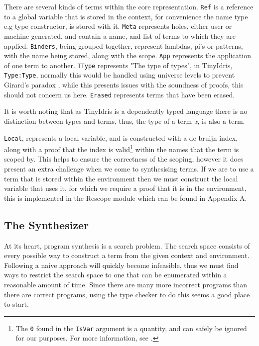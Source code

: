 \documentclass[a4paper]{article}
\begin{document}
There are several kinds of terms within the core representation. 
\texttt{Ref} is a reference to a global variable that is stored in the context, for convenience the name type e.g type constructor, is 
stored with it. \texttt{Meta} represents holes, either user or machine generated, and contain a name, and list of terms to which 
they are applied. \texttt{Binders}, being grouped together, represent lambdas, pi's or patterns, with the name being stored, along with the scope.
\texttt{App} represents the application
of one term to another. \texttt{TType} represents "The type of types", in TinyIdris, \texttt{Type:Type}, normally this would be 
handled using universe levels to prevent Girard's paradox \cite{10.1007/BFb0014058} ,  while this presents issues with the soundness of proofs, this should not concern us here.
\texttt{Erased} represents terms that have been erased. 

It is worth noting that as TinyIdris is a dependently typed language there is no distinction between types and terms, thus, the type of a term \emph{x}, 
is also a term.

\texttt{Local}, represents a local variable, and is constructed with a de bruijn index, along with a proof that the index is 
valid\footnote{The \texttt{0} found in the \texttt{IsVar} argument is a quantity, and can safely be ignored for our purposes. For more information, see \cite{BibEntry2020Nov}.} within the names that the term is scoped by. This helps to ensure the correctness of the scoping, however it 
does present an extra challenge when we come to synthesising terms. If we are to use a term that is stored within the 
environment then we must construct the local variable that uses it, for which we require a proof that it is in the environment,
this is implemented in the Rescope module which can be found in Appendix A. 

\subsection{The Synthesizer}
\label{sec:org00744b4}
At its heart, program synthesis is a search problem. The search space consists of every possible way to
construct a term from the given context and environment. Following a naive approach will quickly become infeasible, 
thus we must find ways to restrict the search space to one that can be enumerated within a reasonable amount of time. Since there are 
many more incorrect programs than there are correct programs, using the type checker to do this seems a good place 
to start. 
\end{document}
